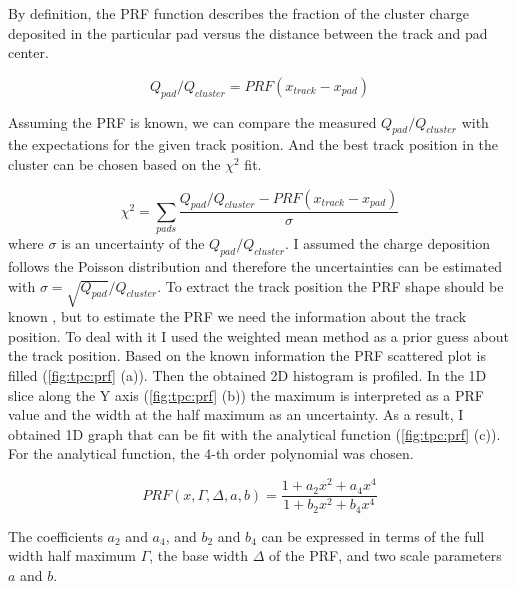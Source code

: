 \documentclass[../main.tex]{subfiles}
\begin{document}
By definition, the PRF function describes the fraction of the cluster charge deposited in the particular pad versus the distance between the track and pad center.

\begin{equation}
Q_{pad}/Q_{cluster} = PRF\left(x_{track} - x_{pad}\right)
\label{eq:prf_def}
\end{equation}

Assuming the PRF is known, we can compare the measured $Q_{pad}/Q_{cluster}$ with the expectations for the given track position. And the best track position in the cluster can be chosen based on the $\chi^2$ fit.

\begin{equation}
\label{eq:tpc:chi2}
\chi^2=\sum_{pads}\frac{Q_{pad}/Q_{cluster} - PRF\left(x_{track} - x_{pad}\right)}{\sigma}
\end{equation}
where $\sigma$ is an uncertainty of the $Q_{pad}/Q_{cluster}$. I assumed the charge deposition follows the Poisson distribution and therefore the uncertainties can be estimated with $\sigma=\sqrt{Q_{pad}}/Q_{cluster}$. To extract the track position the PRF shape should be known , but to estimate the PRF we need the information about the track position. To deal with it I used the weighted mean method as a prior guess about the track position. Based on the known information the PRF scattered plot is filled (\autoref{fig:tpc:prf} (a)). Then the obtained 2D histogram is profiled. In the 1D slice along the Y axis (\autoref{fig:tpc:prf} (b)) the maximum is interpreted as a PRF value and the width at the half maximum as an uncertainty. As a result, I obtained 1D graph that can be fit with the analytical function (\autoref{fig:tpc:prf} (c)). For the analytical function, the 4-th order polynomial was chosen.

\begin{equation}
PRF(x, \Gamma, \Delta, a, b)=\frac{1+a_2x^2+a_4x^4}{1+b_2x^2+b_4x^4}
\label{eq:GL}
\end{equation}

The coefficients $a_2$ and $a_4$, and $b_2$ and $b_4$ can be expressed in terms of the full width half maximum $\Gamma$, the base width $\Delta$ of the PRF, and two scale parameters $a$ and $b$.
\end{document}
